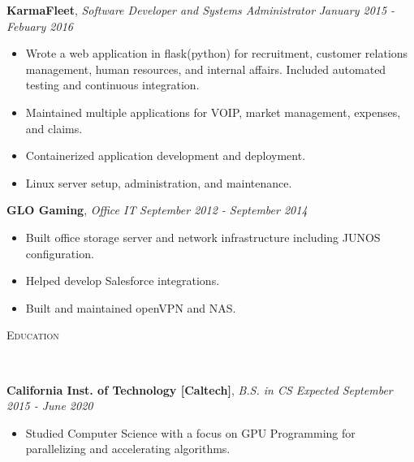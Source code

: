 \documentclass[9pt]{article}
\newenvironment{changemargin}[2]{%
  \begin{list}{}{%
    \setlength{\topsep}{0pt}%
    \setlength{\leftmargin}{#1}%
    \setlength{\rightmargin}{#2}%
    \setlength{\listparindent}{\parindent}%
    \setlength{\itemindent}{\parindent}%
    \setlength{\parsep}{\parskip}%
  }%
  \item[]}{\end{list}
}
\newcommand{\lineover}{
	\begin{changemargin}{-0.05in}{-0.05in}
		\vspace*{-8pt}
		\hrulefill \\
		\vspace*{-2pt}
	\end{changemargin}
}
\newcommand{\header}[1]{
	\begin{changemargin}{-0.5in}{-0.5in}
		\scshape{#1}\\
  	\lineover
	\end{changemargin}
}
\newenvironment{body} {
	\vspace*{-16pt}
	\begin{changemargin}{-0.25in}{-0.5in}
  }	
	{\end{changemargin}
}
\begin{document}
\begin{body}
	\textbf{KarmaFleet}, \emph{Software Developer and Systems Administrator} \hfill \emph{January 2015 - Febuary 2016}\\
	\vspace*{-3pt}
	\begin{itemize} \itemsep -0pt %
		\item Wrote a web application in flask(python) for recruitment, customer relations management, human resources, and internal affairs. Included automated testing and continuous integration.
		\item Maintained multiple applications for VOIP, market management, expenses, and claims.
		\item Containerized application development and deployment.
		\item Linux server setup, administration, and maintenance.
	\end{itemize}
	\vspace*{-2pt}

	\textbf{GLO Gaming}, \emph{Office IT} \hfill \emph{September 2012 - September 2014}\\
	\vspace*{-3pt}
	\begin{itemize} \itemsep -0pt %
		\item Built office storage server and network infrastructure including JUNOS configuration.
		\item Helped develop Salesforce integrations.
		\item Built and maintained openVPN and NAS.
	\end{itemize}
	\vspace*{-2pt}
	
\smallskip
	\vspace*{-3pt}
	\vspace*{-5pt}
\smallskip

\header{Education}
\begin{body}
	\vspace{16pt}
	\textbf{California Inst. of Technology [Caltech]}{}, \emph{B.S. in CS Expected} \hfill \emph{September 2015 - June 2020}{} \\
	\vspace{-3pt}
	\begin{itemize} \itemsep -0pt
    \item Studied Computer Science with a focus on GPU Programming for parallelizing and accelerating algorithms.
	\end{itemize}
\end{body}

\smallskip
\vspace*{-3pt}

	
\end{body}
\end{document}
